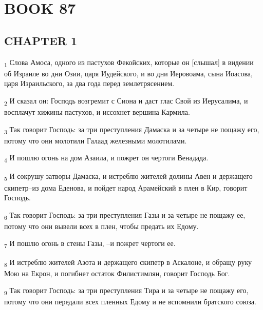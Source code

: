 \section{BOOK 87}
\subsection{CHAPTER 1}
\begin{tcolorbox}
\textsubscript{1} Слова Амоса, одного из пастухов Фекойских, которые он [слышал] в видении об Израиле во дни Озии, царя Иудейского, и во дни Иеровоама, сына Иоасова, царя Израильского, за два года перед землетрясением.
\end{tcolorbox}
\begin{tcolorbox}
\textsubscript{2} И сказал он: Господь возгремит с Сиона и даст глас Свой из Иерусалима, и восплачут хижины пастухов, и иссохнет вершина Кармила.
\end{tcolorbox}
\begin{tcolorbox}
\textsubscript{3} Так говорит Господь: за три преступления Дамаска и за четыре не пощажу его, потому что они молотили Галаад железными молотилами.
\end{tcolorbox}
\begin{tcolorbox}
\textsubscript{4} И пошлю огонь на дом Азаила, и пожрет он чертоги Венадада.
\end{tcolorbox}
\begin{tcolorbox}
\textsubscript{5} И сокрушу затворы Дамаска, и истреблю жителей долины Авен и держащего скипетр--из дома Еденова, и пойдет народ Арамейский в плен в Кир, говорит Господь.
\end{tcolorbox}
\begin{tcolorbox}
\textsubscript{6} Так говорит Господь: за три преступления Газы и за четыре не пощажу ее, потому что они вывели всех в плен, чтобы предать их Едому.
\end{tcolorbox}
\begin{tcolorbox}
\textsubscript{7} И пошлю огонь в стены Газы, --и пожрет чертоги ее.
\end{tcolorbox}
\begin{tcolorbox}
\textsubscript{8} И истреблю жителей Азота и держащего скипетр в Аскалоне, и обращу руку Мою на Екрон, и погибнет остаток Филистимлян, говорит Господь Бог.
\end{tcolorbox}
\begin{tcolorbox}
\textsubscript{9} Так говорит Господь: за три преступления Тира и за четыре не пощажу его, потому что они передали всех пленных Едому и не вспомнили братского союза.
\end{tcolorbox}
